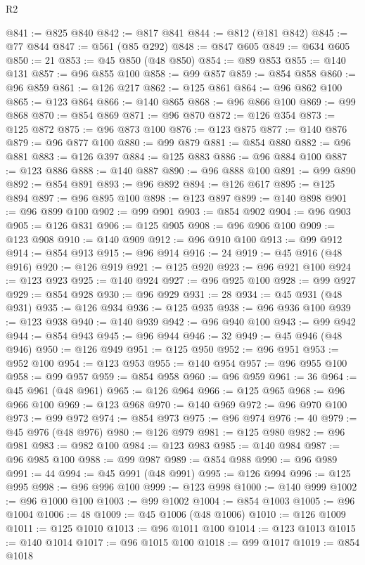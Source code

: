 \begin{lexlean}{R2}
\begin{coremodule}
@841 := @825 @840
@842 := @817 @841
@844 := @812 (@181 @842)
@845 := @77 @844
@847 := @561 (@85 @292)
@848 := @847 @605
@849 := @634 @605
@850 := 21
@853 := @45 @850 (@48 @850)
@854 := @89 @853
@855 := @140 @131
@857 := @96 @855 @100
@858 := @99 @857
@859 := @854 @858
@860 := @96 @859
@861 := @126 @217
@862 := @125 @861
@864 := @96 @862 @100
@865 := @123 @864
@866 := @140 @865
@868 := @96 @866 @100
@869 := @99 @868
@870 := @854 @869
@871 := @96 @870
@872 := @126 @354
@873 := @125 @872
@875 := @96 @873 @100
@876 := @123 @875
@877 := @140 @876
@879 := @96 @877 @100
@880 := @99 @879
@881 := @854 @880
@882 := @96 @881
@883 := @126 @397
@884 := @125 @883
@886 := @96 @884 @100
@887 := @123 @886
@888 := @140 @887
@890 := @96 @888 @100
@891 := @99 @890
@892 := @854 @891
@893 := @96 @892
@894 := @126 @617
@895 := @125 @894
@897 := @96 @895 @100
@898 := @123 @897
@899 := @140 @898
@901 := @96 @899 @100
@902 := @99 @901
@903 := @854 @902
@904 := @96 @903
@905 := @126 @831
@906 := @125 @905
@908 := @96 @906 @100
@909 := @123 @908
@910 := @140 @909
@912 := @96 @910 @100
@913 := @99 @912
@914 := @854 @913
@915 := @96 @914
@916 := 24
@919 := @45 @916 (@48 @916)
@920 := @126 @919
@921 := @125 @920
@923 := @96 @921 @100
@924 := @123 @923
@925 := @140 @924
@927 := @96 @925 @100
@928 := @99 @927
@929 := @854 @928
@930 := @96 @929
@931 := 28
@934 := @45 @931 (@48 @931)
@935 := @126 @934
@936 := @125 @935
@938 := @96 @936 @100
@939 := @123 @938
@940 := @140 @939
@942 := @96 @940 @100
@943 := @99 @942
@944 := @854 @943
@945 := @96 @944
@946 := 32
@949 := @45 @946 (@48 @946)
@950 := @126 @949
@951 := @125 @950
@952 := @96 @951
@953 := @952 @100
@954 := @123 @953
@955 := @140 @954
@957 := @96 @955 @100
@958 := @99 @957
@959 := @854 @958
@960 := @96 @959
@961 := 36
@964 := @45 @961 (@48 @961)
@965 := @126 @964
@966 := @125 @965
@968 := @96 @966 @100
@969 := @123 @968
@970 := @140 @969
@972 := @96 @970 @100
@973 := @99 @972
@974 := @854 @973
@975 := @96 @974
@976 := 40
@979 := @45 @976 (@48 @976)
@980 := @126 @979
@981 := @125 @980
@982 := @96 @981
@983 := @982 @100
@984 := @123 @983
@985 := @140 @984
@987 := @96 @985 @100
@988 := @99 @987
@989 := @854 @988
@990 := @96 @989
@991 := 44
@994 := @45 @991 (@48 @991)
@995 := @126 @994
@996 := @125 @995
@998 := @96 @996 @100
@999 := @123 @998
@1000 := @140 @999
@1002 := @96 @1000 @100
@1003 := @99 @1002
@1004 := @854 @1003
@1005 := @96 @1004
@1006 := 48
@1009 := @45 @1006 (@48 @1006)
@1010 := @126 @1009
@1011 := @125 @1010
@1013 := @96 @1011 @100
@1014 := @123 @1013
@1015 := @140 @1014
@1017 := @96 @1015 @100
@1018 := @99 @1017
@1019 := @854 @1018

\end{coremodule}
\end{lexlean}
